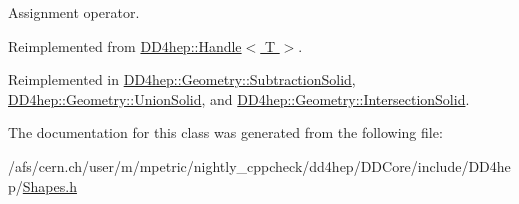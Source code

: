 Assignment operator. 

Reimplemented from \hyperlink{class_d_d4hep_1_1_handle_a9bbf8f498df42e81ad26fb00233505a6}{DD4hep::Handle$<$ T $>$}.

Reimplemented in \hyperlink{class_d_d4hep_1_1_geometry_1_1_subtraction_solid_a6ee8427252bdb96e1549c59164ee4732}{DD4hep::Geometry::SubtractionSolid}, \hyperlink{class_d_d4hep_1_1_geometry_1_1_union_solid_a797ed87b05428ba918935e35562cb364}{DD4hep::Geometry::UnionSolid}, and \hyperlink{class_d_d4hep_1_1_geometry_1_1_intersection_solid_a728f2962e5548d8dd9eee9dad0ec6705}{DD4hep::Geometry::IntersectionSolid}.

The documentation for this class was generated from the following file:\begin{DoxyCompactItemize}
\item 
/afs/cern.ch/user/m/mpetric/nightly\_\-cppcheck/dd4hep/DDCore/include/DD4hep/\hyperlink{_shapes_8h}{Shapes.h}\end{DoxyCompactItemize}
